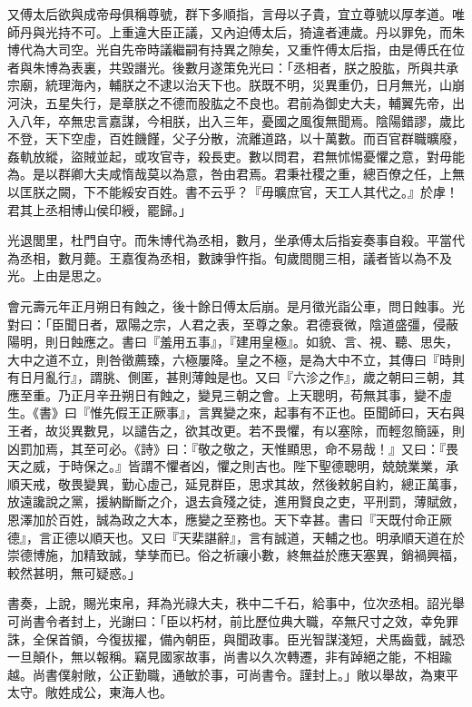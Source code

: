 \begin{pinyinscope}
又傅太后欲與成帝母俱稱尊號，群下多順指，言母以子貴，宜立尊號以厚孝道。唯師丹與光持不可。上重違大臣正議，又內迫傅太后，猗違者連歲。丹以罪免，而朱博代為大司空。光自先帝時議繼嗣有持異之隙矣，又重忤傅太后指，由是傅氏在位者與朱博為表裏，共毀譖光。後數月遂策免光曰：「丞相者，朕之股肱，所與共承宗廟，統理海內，輔朕之不逮以治天下也。朕既不明，災異重仍，日月無光，山崩河決，五星失行，是章朕之不德而股肱之不良也。君前為御史大夫，輔翼先帝，出入八年，卒無忠言嘉謀，今相朕，出入三年，憂國之風復無聞焉。陰陽錯謬，歲比不登，天下空虛，百姓饑饉，父子分散，流離道路，以十萬數。而百官群職曠廢，姦軌放縱，盜賊並起，或攻官寺，殺長吏。數以問君，君無怵惕憂懼之意，對毋能為。是以群卿大夫咸惰哉莫以為意，咎由君焉。君秉社稷之重，總百僚之任，上無以匡朕之闕，下不能綏安百姓。書不云乎？『毋曠庶官，天工人其代之。』於虖！君其上丞相博山侯印綬，罷歸。」

光退閭里，杜門自守。而朱博代為丞相，數月，坐承傅太后指妄奏事自殺。平當代為丞相，數月薨。王嘉復為丞相，數諫爭忤指。旬歲間閱三相，議者皆以為不及光。上由是思之。

會元壽元年正月朔日有蝕之，後十餘日傅太后崩。是月徵光詣公車，問日蝕事。光對曰：「臣聞日者，眾陽之宗，人君之表，至尊之象。君德衰微，陰道盛彊，侵蔽陽明，則日蝕應之。書曰『羞用五事』，『建用皇極』。如貌、言、視、聽、思失，大中之道不立，則咎徵薦臻，六極屢降。皇之不極，是為大中不立，其傳曰『時則有日月亂行』，謂朓、側匿，甚則薄蝕是也。又曰『六沴之作』，歲之朝曰三朝，其應至重。乃正月辛丑朔日有蝕之，變見三朝之會。上天聰明，苟無其事，變不虛生。《書》曰『惟先假王正厥事』，言異變之來，起事有不正也。臣聞師曰，天右與王者，故災異數見，以譴告之，欲其改更。若不畏懼，有以塞除，而輕忽簡誣，則凶罰加焉，其至可必。《詩》曰：『敬之敬之，天惟顯思，命不易哉！』又曰：『畏天之威，于時保之。』皆謂不懼者凶，懼之則吉也。陛下聖德聰明，兢兢業業，承順天戒，敬畏變異，勤心虛己，延見群臣，思求其故，然後敕躬自約，總正萬事，放遠讒說之黨，援納斷斷之介，退去貪殘之徒，進用賢良之吏，平刑罰，薄賦斂，恩澤加於百姓，誠為政之大本，應變之至務也。天下幸甚。書曰『天既付命正厥德』，言正德以順天也。又曰『天棐諶辭』，言有誠道，天輔之也。明承順天道在於崇德博施，加精致誠，孳孳而已。俗之祈禳小數，終無益於應天塞異，銷禍興福，較然甚明，無可疑惑。」

書奏，上說，賜光束帛，拜為光祿大夫，秩中二千石，給事中，位次丞相。詔光舉可尚書令者封上，光謝曰：「臣以朽材，前比歷位典大職，卒無尺寸之效，幸免罪誅，全保首領，今復拔擢，備內朝臣，與聞政事。臣光智謀淺短，犬馬齒臷，誠恐一旦顛仆，無以報稱。竊見國家故事，尚書以久次轉遷，非有踔絕之能，不相踰越。尚書僕射敞，公正勤職，通敏於事，可尚書令。謹封上。」敞以舉故，為東平太守。敞姓成公，東海人也。


\end{pinyinscope}
